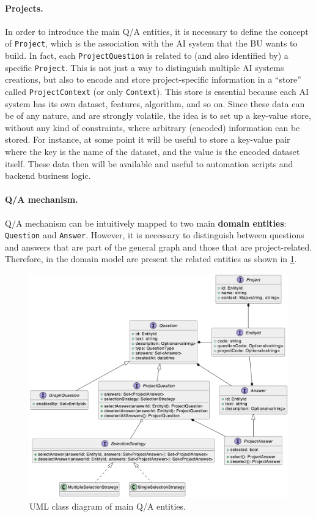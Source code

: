 \documentclass[12pt,a4paper,openright,twoside]{book}
\begin{document}
\paragraph{Projects.}
In order to introduce the main \ac{Q/A} entities, it is necessary to define the concept of \texttt{Project}, which is the association with the \ac{AI} system that the \ac{BU} wants to build.
%
In fact, each \texttt{ProjectQuestion} is related to (and also identified by) a specific \texttt{Project}.
%
This is not just a way to distinguish multiple AI systems creations, but also to encode and store project-specific information in a ``store'' called \texttt{ProjectContext} (or only \texttt{Context}).
%
This store is essential because each \ac{AI} system has its own dataset, features, algorithm, and so on.
%
Since these data can be of any nature, and are strongly volatile, the idea is to set up a key-value store, without any kind of constraints, where arbitrary (encoded) information can be stored.
%
For instance, at some point it will be useful to store a key-value pair where the key is the name of the dataset, and the value is the encoded dataset itself.
%
These data then will be available and useful to automation scripts and backend business logic.


\paragraph{\ac{Q/A} mechanism.}

\ac{Q/A} mechanism can be intuitively mapped to two main \textbf{domain entities}: \texttt{Question} and \texttt{Answer}.
%
However, it is necessary to distinguish between questions and answers that are part of the general graph and those that are project-related.
%
Therefore, in the domain model are present the related entities as shown in \cref{fig:entities}.

\begin{figure}
    \centering
    \includegraphics[width=\linewidth]{figures/diagrams/entities.png}
    \caption{
        UML class diagram of main \ac{Q/A} entities.
    }
    \label{fig:entities}
\end{figure}
\end{document}
